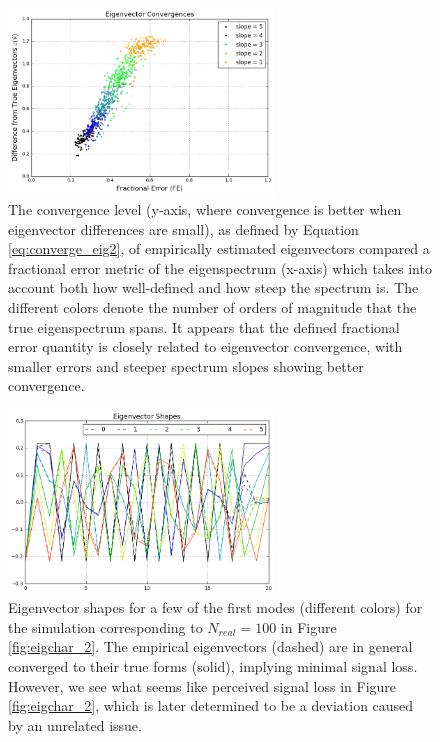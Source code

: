 \begin{figure}
    \centering
	\includegraphics[width=0.63\textwidth]{plots/eigchar_1.png}    
	\caption{The convergence level (y-axis, where convergence is better when eigenvector differences are small), as defined by Equation \eqref{eq:converge_eig2}, of empirically estimated eigenvectors compared a fractional error metric of the eigenspectrum (x-axis) which takes into account both how well-defined and how steep the spectrum is. The different colors denote the number of orders of magnitude that the true eigenspectrum spans. It appears that the defined fractional error quantity is closely related to eigenvector convergence, with smaller errors and steeper spectrum slopes showing better convergence.}
    \label{fig:eigchar_1}
\end{figure}

\begin{figure}
    \centering
	\includegraphics[width=0.63\textwidth]{plots/eigchar_3.png}    
	\caption{Eigenvector shapes for a few of the first modes (different colors) for the simulation corresponding to $N_{real}=100$ in Figure \ref{fig:eigchar_2}. The empirical eigenvectors (dashed) are in general converged to their true forms (solid), implying minimal signal loss. However, we see what seems like perceived signal loss in Figure \ref{fig:eigchar_2}, which is later determined to be a deviation caused by an unrelated issue.}
    \label{fig:eigchar_3}
\end{figure}

